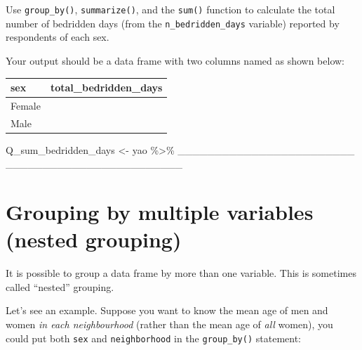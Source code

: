 \documentclass[
  letterpaper,
  DIV=11,
  numbers=noendperiod]{scrreprt}
\newenvironment{Shaded}{\begin{snugshade}}{\end{snugshade}}
\newcommand{\NormalTok}[1]{\textcolor[rgb]{0.00,0.23,0.31}{#1}}
\newcommand{\OtherTok}[1]{\textcolor[rgb]{0.00,0.23,0.31}{#1}}
\newcommand{\SpecialCharTok}[1]{\textcolor[rgb]{0.37,0.37,0.37}{#1}}
\begin{document}
\begin{tcolorbox}[enhanced jigsaw, titlerule=0mm, colback=white, left=2mm, breakable, opacitybacktitle=0.6, colbacktitle=quarto-callout-tip-color!10!white, colframe=quarto-callout-tip-color-frame, bottomtitle=1mm, opacityback=0, coltitle=black, arc=.35mm, toptitle=1mm, title=\textcolor{quarto-callout-tip-color}{\faLightbulb}\hspace{0.5em}{Practice}, leftrule=.75mm, toprule=.15mm, bottomrule=.15mm, rightrule=.15mm]

Use \texttt{group\_by()}, \texttt{summarize()}, and the \texttt{sum()}
function to calculate the total number of bedridden days (from the
\texttt{n\_bedridden\_days} variable) reported by respondents of each
sex.

Your output should be a data frame with two columns named as shown
below:

\begin{longtable}[]{@{}ll@{}}
\toprule\noalign{}
sex & total\_bedridden\_days \\
\midrule\noalign{}
\endhead
\bottomrule\noalign{}
\endlastfoot
Female & \\
Male & \\
\end{longtable}

\begin{Shaded}
\begin{Highlighting}[]
\NormalTok{Q\_sum\_bedridden\_days }\OtherTok{\textless{}{-}} 
\NormalTok{  yao }\SpecialCharTok{\%\textgreater{}\%} 
\NormalTok{  \_\_\_\_\_\_\_\_\_\_\_\_\_\_\_\_\_\_\_\_\_\_\_\_}
\NormalTok{  \_\_\_\_\_\_\_\_\_\_\_\_\_\_\_\_\_\_\_\_\_\_\_\_}
\end{Highlighting}
\end{Shaded}

\end{tcolorbox}

\section{Grouping by multiple variables (nested
grouping)}\label{grouping-by-multiple-variables-nested-grouping}

It is possible to group a data frame by more than one variable. This is
sometimes called ``nested'' grouping.

Let's see an example. Suppose you want to know the mean age of men and
women \emph{in each neighbourhood} (rather than the mean age of
\emph{all} women), you could put both \texttt{sex} and
\texttt{neighborhood} in the \texttt{group\_by()} statement:
\end{document}
